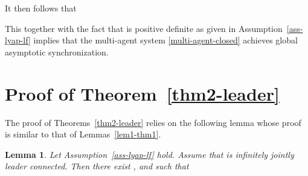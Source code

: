 \documentclass[a4paper, 11pt]{article}
\newtheorem{lemma}{Lemma}
\begin{document}
It then follows that

This together with the fact that  is positive definite as given in Assumption~\ref{ass-lyap-lf} implies that
the multi-agent system \eqref{multi-agent-closed} achieves global asymptotic synchronization.

\section{Proof of Theorem~\ref{thm2-leader}}\label{app-lf2}
The proof of Theorems~\ref{thm2-leader} relies on the following lemma whose proof is similar to that of Lemmas~\ref{lem1-thm1}.

\begin{lemma}\label{lem1-thm4}
Let Assumption~\ref{ass-lyap-lf} hold. Assume that  is infinitely jointly leader connected.
Then there exist ,  and  such that

\end{lemma}
\end{document}
